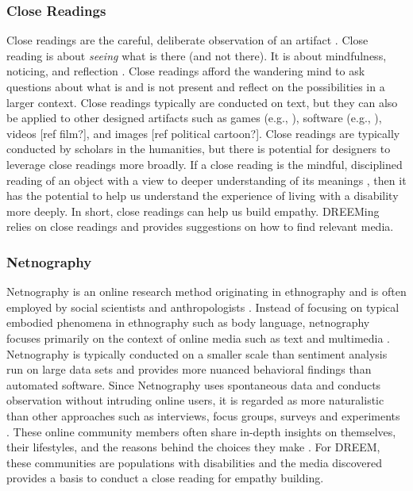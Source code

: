 \subsubsection{Close Readings\label{CloseReadings}}
Close readings are the careful, deliberate observation of an artifact \cite{brummettTechniquesCloseReading2019}. Close reading is about \textit{seeing} what is there (and not there). It is about mindfulness, noticing, and reflection \cite{brummettTechniquesCloseReading2019}. Close readings afford the wandering mind to ask questions about what is and is not present and reflect on the possibilities in a larger context. Close readings typically are conducted on text, but they can also be applied to other designed artifacts such as games (e.g., \cite{wardrip-fruinHowPacManEats2020}), software (e.g., \cite{sackSoftwareArts2019}), videos {\color{red}[ref film?]}, and images {\color{red}[ref political cartoon?]}. Close readings are typically conducted by scholars in the humanities, but there is potential for designers to leverage close readings more broadly. If a close reading is the mindful, disciplined reading of an object with a view to deeper understanding of its meanings \cite{brummettTechniquesCloseReading2019}, then it has the potential to help us understand the experience of living with a disability more deeply. In short, close readings can help us build empathy. DREEMing relies on close readings and provides suggestions on how to find relevant media.

\subsubsection{Netnography}
Netnography is an online research method originating in ethnography and is often employed by social scientists and anthropologists \cite{kozinetsNetnographyEssentialGuide2019}. Instead of focusing on typical embodied phenomena in ethnography such as body language, netnography focuses primarily on the context of online media such as text and multimedia \cite{bartlReviewAnalysisLiterature2016}. Netnography is typically conducted on a smaller scale than sentiment analysis run on large data sets and provides more nuanced behavioral findings than automated software. Since Netnography uses spontaneous data and conducts observation without intruding online users, it is regarded as more naturalistic than other approaches such as interviews, focus groups, surveys and experiments \cite{kozinetsNetnographyRedefined2015}. These online community members often share in-depth insights on themselves, their lifestyles, and the reasons behind the choices they make \cite{kozinetsNetnographyEssentialGuide2019}.  For DREEM, these communities are populations with disabilities and the media discovered provides a basis to conduct a close reading for empathy building.

